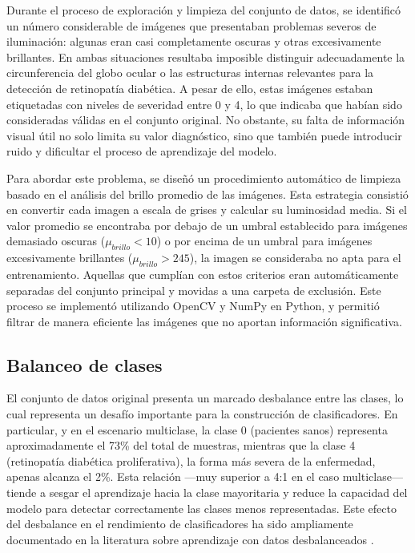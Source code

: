 Durante el proceso de exploración y limpieza del conjunto de datos, se identificó un número considerable de imágenes que presentaban problemas severos de iluminación: algunas eran casi completamente oscuras y otras excesivamente brillantes. En ambas situaciones resultaba imposible distinguir adecuadamente la circunferencia del globo ocular o las estructuras internas relevantes para la detección de retinopatía diabética. A pesar de ello, estas imágenes estaban etiquetadas con niveles de severidad entre 0 y 4, lo que indicaba que habían sido consideradas válidas en el conjunto original. No obstante, su falta de información visual útil no solo limita su valor diagnóstico, sino que también puede introducir ruido y dificultar el proceso de aprendizaje del modelo.

Para abordar este problema, se diseñó un procedimiento automático de limpieza basado en el análisis del brillo promedio de las imágenes. Esta estrategia consistió en convertir cada imagen a escala de grises y calcular su luminosidad media. Si el valor promedio se encontraba por debajo de un umbral establecido para imágenes demasiado oscuras ($\mu_{brillo} < 10$) o por encima de un umbral para imágenes excesivamente brillantes ($\mu_{brillo} > 245$), la imagen se consideraba no apta para el entrenamiento. Aquellas que cumplían con estos criterios eran automáticamente separadas del conjunto principal y movidas a una carpeta de exclusión. Este proceso se implementó utilizando OpenCV y NumPy en Python, y permitió filtrar de manera eficiente las imágenes que no aportan información significativa.

\subsection{Balanceo de clases}

El conjunto de datos original presenta un marcado desbalance entre las clases, lo cual representa un desafío importante para la construcción de clasificadores. En particular, y en el escenario multiclase, la clase 0 (pacientes sanos) representa aproximadamente el 73\% del total de muestras, mientras que la clase 4 (retinopatía diabética proliferativa), la forma más severa de la enfermedad, apenas alcanza el 2\%. Esta relación —muy superior a 4:1 en el caso multiclase— tiende a sesgar el aprendizaje hacia la clase mayoritaria y reduce la capacidad del modelo para detectar correctamente las clases menos representadas. Este efecto del desbalance en el rendimiento de clasificadores ha sido ampliamente documentado en la literatura sobre aprendizaje con datos desbalanceados  .

